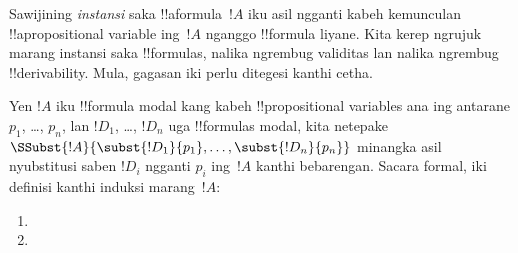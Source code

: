 \documentclass[../../../include/open-logic-section]{subfiles}
\begin{document}


Sawijining \emph{instansi} saka !!a{formula}~$!A$ iku asil
ngganti kabeh kemunculan !!a{propositional variable} ing~$!A$
nganggo !!{formula} liyane. Kita kerep ngrujuk marang instansi
saka !!{formula}s, nalika ngrembug validitas lan nalika ngrembug
!!{derivability}. Mula, gagasan iki perlu ditegesi kanthi cetha.

\begin{defn}
  Yen $!A$ iku !!{formula} modal kang kabeh !!{propositional
    variable}s ana ing antarane $p_1$, \dots, $p_n$, lan $!D_1$, \dots,
  $!D_n$ uga !!{formula}s modal, kita netepake
  $\SSubst{!A}{\subst{!D_1}{p_1}, \dots, \subst{!D_n}{p_n}}$ minangka asil nyubstitusi saben $!D_i$ ngganti $p_i$
  ing~$!A$ kanthi bebarengan. Sacara formal, iki definisi kanthi induksi marang~$!A$:
  \begin{enumerate}
    \item {}
    \item {}
\end{enumerate}
\end{defn}
\end{document}
